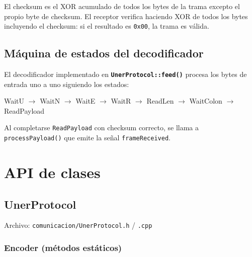 \documentclass[12pt,a4paper]{report}
\newcommand{\file}[1]{\texttt{#1}}
\newcommand{\class}[1]{\texttt{\textbf{#1}}}
\begin{document}
El checksum es el XOR acumulado de todos los bytes de la trama excepto el
propio byte de checksum.  El receptor verifica haciendo XOR de todos los
bytes incluyendo el checksum: si el resultado es \texttt{0x00}, la trama
es válida.

\section{Máquina de estados del decodificador}

El decodificador implementado en \class{UnerProtocol::feed()} procesa los
bytes de entrada uno a uno siguiendo los estados:

\begin{center}
WaitU $\to$ WaitN $\to$ WaitE $\to$ WaitR $\to$ ReadLen $\to$ WaitColon $\to$ ReadPayload
\end{center}

Al completarse \texttt{ReadPayload} con checksum correcto, se llama a
\texttt{processPayload()} que emite la señal \texttt{frameReceived}.

\chapter{API de clases}

\section{UnerProtocol}

Archivo: \file{comunicacion/UnerProtocol.h} / \file{.cpp}

\subsection{Encoder (métodos estáticos)}
\end{document}
